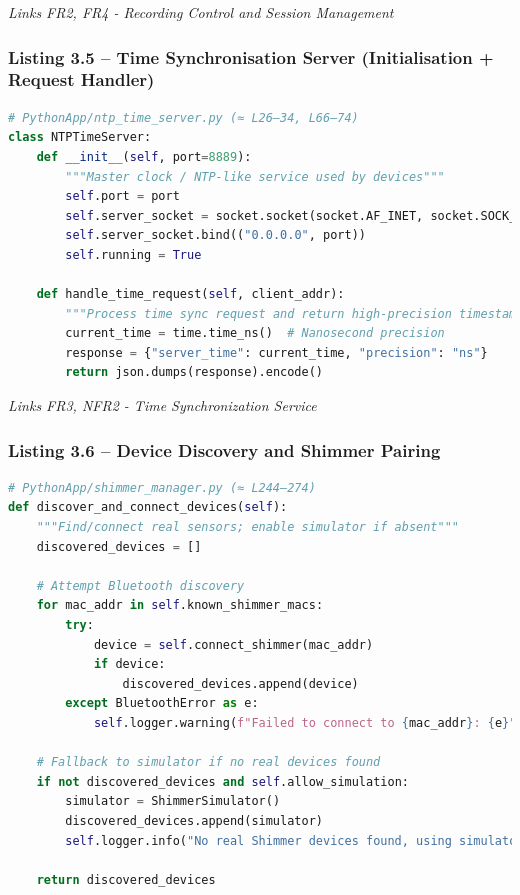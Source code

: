 \documentclass[12pt,a4paper]{article}
\begin{document}
\emph{Links FR2, FR4 - Recording Control and Session Management}

\subsubsection{Listing 3.5 -- Time Synchronisation Server (Initialisation + Request Handler)}\label{listing-3.5-time-synchronisation-server-initialisation-request-handler}

\begin{lstlisting}[language=Python]
# PythonApp/ntp_time_server.py (≈ L26–34, L66–74)
class NTPTimeServer:
    def __init__(self, port=8889):
        """Master clock / NTP-like service used by devices"""
        self.port = port
        self.server_socket = socket.socket(socket.AF_INET, socket.SOCK_DGRAM)
        self.server_socket.bind(("0.0.0.0", port))
        self.running = True
    
    def handle_time_request(self, client_addr):
        """Process time sync request and return high-precision timestamp"""
        current_time = time.time_ns()  # Nanosecond precision
        response = {"server_time": current_time, "precision": "ns"}
        return json.dumps(response).encode()
\end{lstlisting}

\emph{Links FR3, NFR2 - Time Synchronization Service}

\subsubsection{Listing 3.6 -- Device Discovery and Shimmer Pairing}\label{listing-3.6-device-discovery-and-shimmer-pairing}

\begin{lstlisting}[language=Python]
# PythonApp/shimmer_manager.py (≈ L244–274)
def discover_and_connect_devices(self):
    """Find/connect real sensors; enable simulator if absent"""
    discovered_devices = []
    
    # Attempt Bluetooth discovery
    for mac_addr in self.known_shimmer_macs:
        try:
            device = self.connect_shimmer(mac_addr)
            if device:
                discovered_devices.append(device)
        except BluetoothError as e:
            self.logger.warning(f"Failed to connect to {mac_addr}: {e}")
    
    # Fallback to simulator if no real devices found
    if not discovered_devices and self.allow_simulation:
        simulator = ShimmerSimulator()
        discovered_devices.append(simulator)
        self.logger.info("No real Shimmer devices found, using simulator")
    
    return discovered_devices
\end{lstlisting}
\end{document}
